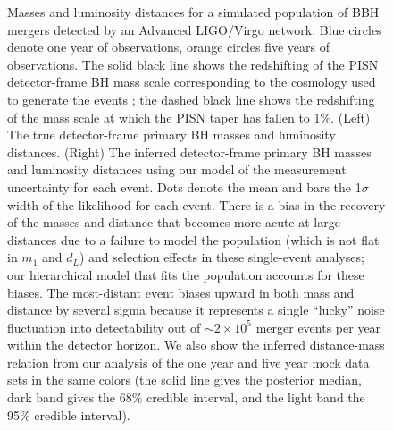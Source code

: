 \documentclass[modern]{aastex62}
\begin{document}
\begin{figure}
%
  \caption{\label{fig:m1-dL} Masses and luminosity distances for a simulated
  population of \ac{BBH} mergers detected by an Advanced LIGO/Virgo network.
  Blue circles denote one year of observations, orange circles five years of
  observations. The solid black line shows the redshifting of the PISN
  detector-frame \ac{BH} mass scale corresponding to the cosmology used to
  generate the events \citep[TT, TE, EE + lowP + lensing + ext]{Planck2016}; the
  dashed black line shows the redshifting of the mass scale at which the
  \ac{PISN} taper has fallen to 1\%.  (Left) The true detector-frame primary
  \ac{BH} masses and luminosity distances.   (Right) The inferred detector-frame
  primary \ac{BH} masses and luminosity distances using our model of the
  measurement uncertainty for each event. Dots denote the mean and bars the
  1$\sigma$ width of the likelihood for each event.  There is a bias in the
  recovery of the masses and distance that becomes more acute at large distances
  due to a failure to model the population (which is not flat in $m_1$ and
  $d_L$) and selection effects in these single-event analyses; our hierarchical
  model that fits the population accounts for these biases. The most-distant
  event biases upward in both mass and distance by several sigma because it
  represents a single ``lucky'' noise fluctuation into detectability out of
  $\sim 2 \times 10^5$ merger events per year within the detector horizon.  We
  also show the inferred distance-mass relation from our analysis of the one
  year and five year mock data sets in the same colors (the solid line gives the
  posterior median, dark band gives the 68\% credible interval, and the light
  band the 95\% credible interval).}
%
\end{figure}
\end{document}
